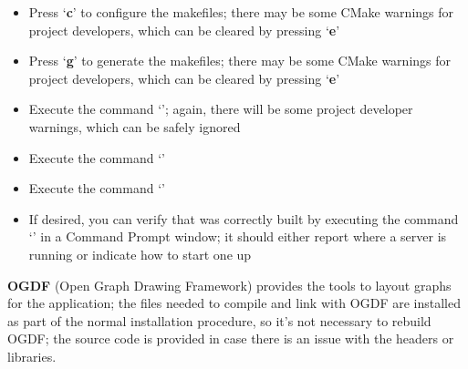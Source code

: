 \begin{itemize}
`\textbf{YARP\fUS{}USE\fUS{}READLINE}' (if present) should be disabled
\item\exSp{}Press `\textbf{c}' to configure the makefiles; there may be some CMake
warnings for project developers, which can be cleared by pressing `\textbf{e}'
\item\exSp{}Press `\textbf{g}' to generate the makefiles; there may be some CMake
warnings for project developers, which can be cleared by pressing `\textbf{e}'
\item\exSp{}Execute the command `'; again, there will be some project
developer warnings, which can be safely ignored
\item\exSp{}Execute the command `'
\item\exSp{}Execute the command `'
\item\exSp{}If desired, you can verify that \yarp{} was correctly built by executing the
command `' in a Command Prompt window; it should either report where a
\yarp{} server is running or indicate how to start one up
\end{itemize}
\tertiaryEnd
\secondaryEnd
{}
\textbf{OGDF} (Open Graph Drawing Framework) provides the tools to layout graphs for the
\MMMU{} application; the files needed to compile and link with OGDF are installed as part
of the normal \mplusm{} installation procedure, so it's not necessary to rebuild OGDF; the
source code is provided in case there is an issue with the headers or libraries.

